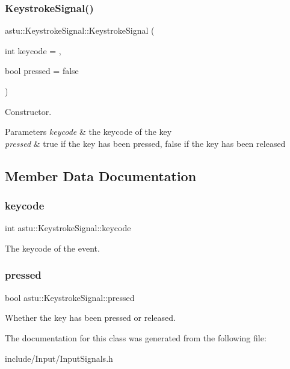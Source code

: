 \subsubsection{\texorpdfstring{Keystroke\+Signal()}{KeystrokeSignal()}}
{\footnotesize\ttfamily astu\+::\+Keystroke\+Signal\+::\+Keystroke\+Signal (\begin{DoxyParamCaption}\item[{int}]{keycode = {},  }\item[{bool}]{pressed = {\ttfamily false} }\end{DoxyParamCaption})\hspace{0.3cm}{\ttfamily [inline]}}

Constructor.


\begin{DoxyParams}{Parameters}
{\em keycode} & the keycode of the key \\
\hline
{\em pressed} & {\ttfamily true} if the key has been pressed, {\ttfamily false} if the key has been released \\
\hline
\end{DoxyParams}


\subsection{Member Data Documentation}
\mbox{\label{classastu_1_1KeystrokeSignal_aae93fc72328b3093ed647f12a8a5beee}} 
\subsubsection{\texorpdfstring{keycode}{keycode}}
{\footnotesize\ttfamily int astu\+::\+Keystroke\+Signal\+::keycode}

The keycode of the event. \mbox{\label{classastu_1_1KeystrokeSignal_a73eaa883c38870bba32baa797f4bb0ac}} 
\subsubsection{\texorpdfstring{pressed}{pressed}}
{\footnotesize\ttfamily bool astu\+::\+Keystroke\+Signal\+::pressed}

Whether the key has been pressed or released. 

The documentation for this class was generated from the following file\+:\begin{DoxyCompactItemize}
\item 
include/\+Input/Input\+Signals.\+h\end{DoxyCompactItemize}
